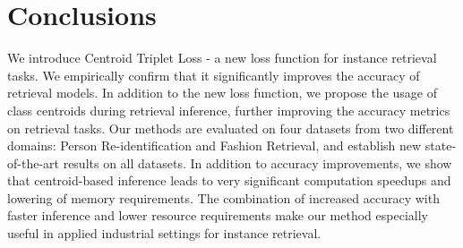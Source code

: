 \documentclass[sigconf,nonacm]{acmart}
\begin{document}
\section{Conclusions}
We introduce Centroid Triplet Loss - a new loss function for instance retrieval tasks. We empirically confirm that it significantly improves the accuracy of retrieval models. In addition to the new loss function, we propose the usage of class centroids during retrieval inference, further improving the accuracy metrics on retrieval tasks. Our methods are evaluated on four datasets from two different domains: Person Re-identification and Fashion Retrieval, and establish new state-of-the-art results on all datasets. In addition to accuracy improvements, we show that centroid-based inference leads to very significant computation speedups and lowering of memory requirements. The combination of increased accuracy with faster inference and lower resource requirements make our method especially useful in applied industrial settings for instance retrieval.



\end{document}
